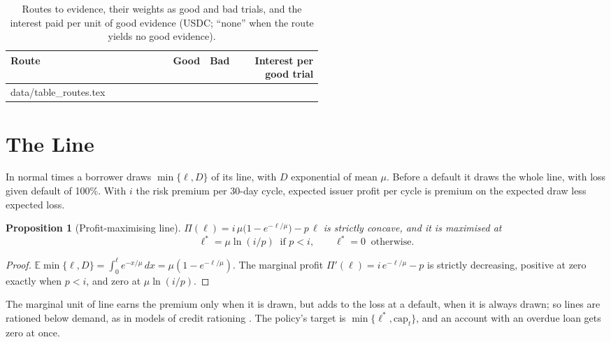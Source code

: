 \documentclass[preprint,11pt,authoryear]{elsarticle}
\makeatletter
\newtheorem{proposition}{Proposition}
\newcommand{\inputrows}[1]{\@@input #1 }
\makeatother
\begin{document}
\begin{table}[ht]
  \centering\small
  \caption{Routes to evidence, their weights as good and bad trials, and the interest paid per unit
  of good evidence (USDC; ``none'' when the route yields no good evidence).}
  \label{tab:routes}
  \begin{tabular}{p{0.52\linewidth}rrr}
    \toprule
    Route & Good & Bad & Interest per good trial \\
    \midrule
    \inputrows{data/table_routes.tex}
    \bottomrule
  \end{tabular}
\end{table}

\section{The Line}\label{sec:line}

In normal times a borrower draws $\min\{\ell,D\}$ of its line, with $D$ exponential of mean $\mu$.
Before a default it draws the whole line, with loss given default of 100\%. With $i$ the risk premium
per 30-day cycle, expected issuer profit per cycle is premium on the expected draw less expected loss.

\begin{proposition}[Profit-maximising line]\label{prop:line}
$\Pi(\ell)=i\,\mu\bigl(1-e^{-\ell/\mu}\bigr)-p\,\ell$ is strictly concave, and it is maximised at
\[
  \ell^*=\mu\ln(i/p)\ \text{ if } p<i,\qquad \ell^*=0\ \text{ otherwise}.
\]
\end{proposition}

\begin{proof}
$\mathbb{E}\min\{\ell,D\}=\int_0^\ell e^{-x/\mu}\,dx=\mu(1-e^{-\ell/\mu})$. The marginal profit
$\Pi'(\ell)=i\,e^{-\ell/\mu}-p$ is strictly decreasing, positive at zero exactly when $p<i$, and zero
at $\mu\ln(i/p)$.
\end{proof}

The marginal unit of line earns the premium only when it is drawn, but adds to the loss at a default,
when it is always drawn; so lines are rationed below demand, as in models of credit rationing
\citep{stiglitz1981rationing}. The policy's target is $\min\{\ell^*,\mathrm{cap}_t\}$, and an account
with an overdue loan gets zero at once.
\end{document}
